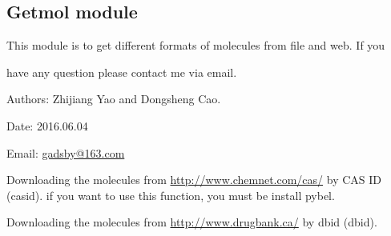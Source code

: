 \documentclass[letterpaper,10pt,english]{sphinxmanual}
\begin{document}

\begin{fulllineitems}
\label{reference/GetDNA:GetDNA.Seq}
\end{fulllineitems}



\subsection{Getmol module}
\label{reference/Getmol:module-Getmol}\label{reference/Getmol:getmol-module}\label{reference/Getmol::doc}
This module is to get different formats of molecules from file and web. If you

have any question please contact me via email.

Authors: Zhijiang Yao and Dongsheng Cao.

Date: 2016.06.04

Email: \href{mailto:gadsby@163.com}{gadsby@163.com}

\begin{fulllineitems}
\label{reference/Getmol:Getmol.GetMolFromCAS}
Downloading the molecules from \url{http://www.chemnet.com/cas/} by CAS ID (casid).
if you want to use this function, you must be install pybel.

\end{fulllineitems}


\begin{fulllineitems}
\label{reference/Getmol:Getmol.GetMolFromDrugbank}
Downloading the molecules from \url{http://www.drugbank.ca/} by dbid (dbid).

\end{fulllineitems}


\begin{fulllineitems}
\label{reference/Getmol:Getmol.GetMolFromEBI}
\end{fulllineitems}
\end{document}

